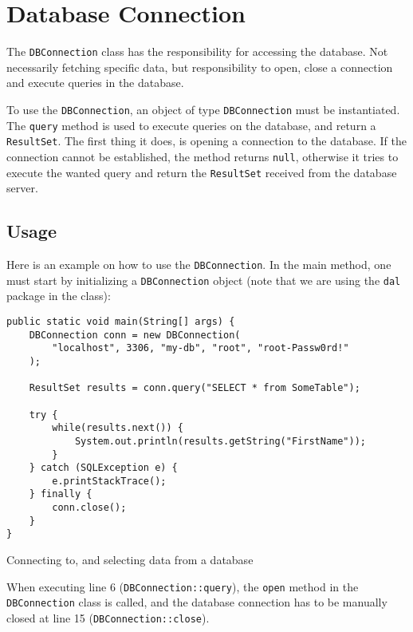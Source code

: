 \clearpage
\section{Database Connection}

The \texttt{DBConnection} class has the responsibility for accessing the database. Not necessarily fetching specific data, but responsibility to open, close a connection and execute queries in the database.

To use the \texttt{DBConnection}, an object of type \texttt{DBConnection} must be instantiated. The \texttt{query} method is used to execute queries on the database, and return a \texttt{ResultSet}. The first thing it does, is opening a connection to the database. If the connection cannot be established, the method returns \texttt{null}, otherwise it tries to execute the wanted query and return the \texttt{ResultSet} received from the database server.

\subsection{Usage}
Here is an example on how to use the \texttt{DBConnection}. In the main method, one must start by initializing a \texttt{DBConnection} object (note that we are using the \texttt{dal} package in the class):

\begin{listing}[ht]
\begin{verbatim}
public static void main(String[] args) {
    DBConnection conn = new DBConnection(
        "localhost", 3306, "my-db", "root", "root-Passw0rd!"
    );
    
    ResultSet results = conn.query("SELECT * from SomeTable");
    
    try {
        while(results.next()) {
            System.out.println(results.getString("FirstName"));
        }
    } catch (SQLException e) {
        e.printStackTrace();
    } finally {
        conn.close();
    }
}
\end{verbatim}
\caption{Connecting to, and selecting data from a database}
\label{listing:1}
\end{listing}

When executing line 6 (\texttt{DBConnection::query}), the \texttt{open} method in the \texttt{DBConnection} class is called, and the database connection has to be manually closed at line 15 (\texttt{DBConnection::close}).


